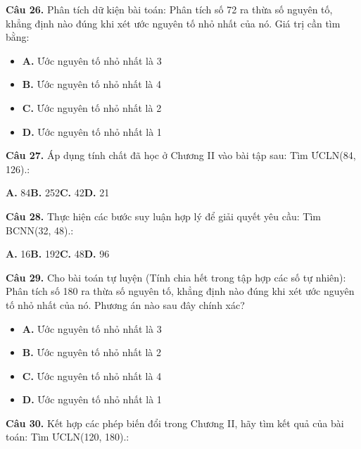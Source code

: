 \documentclass[11pt,a4paper]{article}
\begin{document}
\textbf{\color{primary} Câu 26.} Phân tích dữ kiện bài toán: Phân tích số 72 ra thừa số nguyên tố, khẳng định nào đúng khi xét ước nguyên tố nhỏ nhất của nó. Giá trị cần tìm bằng:\par
\begin{itemize}\setlength{\itemsep}{1pt}\setlength{\parskip}{0pt}
  \item[] \textbf{A.} Ước nguyên tố nhỏ nhất là 3
  \item[] \textbf{B.} Ước nguyên tố nhỏ nhất là 4
  \item[] \textbf{C.} Ước nguyên tố nhỏ nhất là 2
  \item[] \textbf{D.} Ước nguyên tố nhỏ nhất là 1
\end{itemize}\vspace{2pt}
\textbf{\color{primary} Câu 27.} Áp dụng tính chất đã học ở Chương II vào bài tập sau: Tìm ƯCLN(84, 126).:\par
\hspace*{1.5em}\textbf{A.} 84\quad\quad \textbf{B.} 252\quad\quad \textbf{C.} 42\quad\quad \textbf{D.} 21\par\vspace{2pt}
\textbf{\color{primary} Câu 28.} Thực hiện các bước suy luận hợp lý để giải quyết yêu cầu: Tìm BCNN(32, 48).:\par
\hspace*{1.5em}\textbf{A.} 16\quad\quad \textbf{B.} 192\quad\quad \textbf{C.} 48\quad\quad \textbf{D.} 96\par\vspace{2pt}
\textbf{\color{primary} Câu 29.} Cho bài toán tự luyện (Tính chia hết trong tập hợp các số tự nhiên): Phân tích số 180 ra thừa số nguyên tố, khẳng định nào đúng khi xét ước nguyên tố nhỏ nhất của nó. Phương án nào sau đây chính xác?\par
\begin{itemize}\setlength{\itemsep}{1pt}\setlength{\parskip}{0pt}
  \item[] \textbf{A.} Ước nguyên tố nhỏ nhất là 3
  \item[] \textbf{B.} Ước nguyên tố nhỏ nhất là 2
  \item[] \textbf{C.} Ước nguyên tố nhỏ nhất là 4
  \item[] \textbf{D.} Ước nguyên tố nhỏ nhất là 1
\end{itemize}\vspace{2pt}
\textbf{\color{primary} Câu 30.} Kết hợp các phép biến đổi trong Chương II, hãy tìm kết quả của bài toán: Tìm ƯCLN(120, 180).:\par
\end{document}
